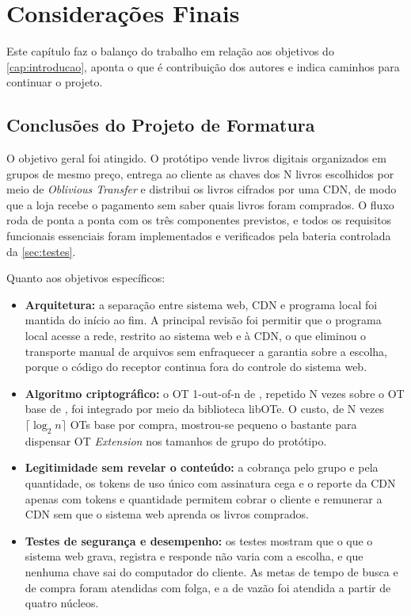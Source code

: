 \chapter{Considerações Finais}\label{cap:consideracoes}

Este capítulo faz o balanço do trabalho em relação aos objetivos do
\autoref{cap:introducao}, aponta o que é contribuição dos autores e indica
caminhos para continuar o projeto.

\section{Conclusões do Projeto de Formatura}

O objetivo geral foi atingido. O protótipo vende livros digitais organizados em
grupos de mesmo preço, entrega ao cliente as chaves dos N livros escolhidos por
meio de \emph{Oblivious Transfer} e distribui os livros cifrados por uma CDN,
de modo que a loja recebe o pagamento sem saber quais livros foram comprados.
O fluxo roda de ponta a ponta com os três componentes previstos, e todos os
requisitos funcionais essenciais foram implementados e verificados pela
bateria controlada da \autoref{sec:testes}.

Quanto aos objetivos específicos:

\begin{itemize}
\item \textbf{Arquitetura:} a separação entre sistema web, CDN e programa local
foi mantida do início ao fim. A principal revisão foi permitir que o programa
local acesse a rede, restrito ao sistema web e à CDN, o que eliminou o
transporte manual de arquivos sem enfraquecer a garantia sobre a escolha,
porque o código do receptor continua fora do controle do sistema web.

\item \textbf{Algoritmo criptográfico:} o OT 1-out-of-n de
, repetido N vezes sobre o OT base de
, foi integrado por meio da biblioteca libOTe. O
custo, de N vezes $\lceil \log_2 n \rceil$ OTs base por compra, mostrou-se
pequeno o bastante para dispensar OT \emph{Extension} nos tamanhos de grupo do
protótipo.

\item \textbf{Legitimidade sem revelar o conteúdo:} a cobrança pelo grupo e
pela quantidade, os tokens de uso único com assinatura cega e o reporte da CDN
apenas com tokens e quantidade permitem cobrar o cliente e remunerar a CDN sem
que o sistema web aprenda os livros comprados.

\item \textbf{Testes de segurança e desempenho:} os testes mostram que o que o
sistema web grava, registra e responde não varia com a escolha, e que nenhuma
chave sai do computador do cliente. As metas de tempo de busca e de compra
foram atendidas com folga, e a de vazão foi atendida a partir de quatro
núcleos.
\end{itemize}

